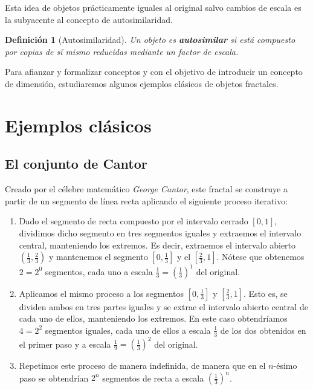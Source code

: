 \documentclass[11pt]{report}
\newtheorem{definicion}{Definición}
\begin{document}
Esta idea de objetos prácticamente iguales al original salvo cambios de escala es la subyacente al concepto de autosimilaridad.

\begin{definicion}[Autosimilaridad] Un objeto es \textbf{autosimilar} si está compuesto por copias de sí mismo reducidas mediante un factor de escala.
\end{definicion}

Para afianzar y formalizar conceptos y con el objetivo de introducir un concepto de dimensión, estudiaremos algunos ejemplos clásicos de objetos fractales.

\section{Ejemplos clásicos}
\label{section:ejemplos}

\subsection{El conjunto de Cantor}
\label{subsection:Cantor}

Creado por el célebre matemático \textit{George Cantor}, este fractal se construye a partir de un segmento de línea recta aplicando el siguiente proceso iterativo:

\begin{enumerate}
\item Dado el segmento de recta compuesto por el intervalo cerrado $[0,1]$, dividimos dicho segmento en tres segmentos iguales y extraemos el intervalo central, manteniendo los extremos. Es decir, extraemos el intervalo abierto $\left(\frac 1 3, \frac 2 3\right)$ y mantenemos el segmento $\left[0,\frac 1 3\right]$ y el $\left[\frac 2 3, 1\right]$. Nótese que obtenemos $2=2^0$ segmentos, cada uno a escala $\frac 1 3=\left(\frac 1 3\right)^1$ del original.

\item Aplicamos el mismo proceso a los segmentos $\left[0,\frac 1 3\right]$ y $\left[\frac 2 3, 1\right]$. Esto es, se dividen ambos en tres partes iguales y se extrae el intervalo abierto central de cada uno de ellos, manteniendo los extremos. En este caso obtendríamos $4=2^2$ segmentos iguales, cada uno de ellos a escala $\frac 1 3$ de los dos obtenidos en el primer paso y a escala $\frac 1 9=\left(\frac 1 3\right)^2$ del original.

\item Repetimos este proceso de manera indefinida, de manera que en el $n$-ésimo paso se obtendrían $2^n$ segmentos de recta a escala $\left(\frac 1 3\right)^n$.
\end{enumerate} 
\end{document}
